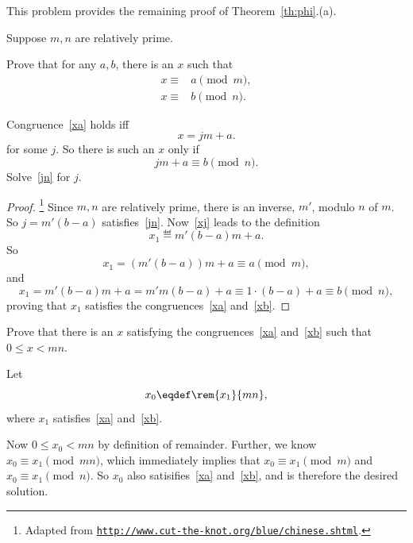 \begin{notesproblem}\label{phi2}
This problem provides the remaining proof of Theorem~\ref{th:phi}.(a).

Suppose $m,n$ are relatively prime.

\bparts

\ppart Prove that for any $a,b$, there is an
$x$ such that
\begin{align}
x \equiv & a \pmod{m}, \label{xa}\\
x \equiv & b \pmod{n} \label{xb}.
\end{align}

\hint Congruence~\eqref{xa} holds iff
\begin{equation}\label{xj}
x = jm + a.
\end{equation}
for some $j$.  So there is such an $x$ only if
\begin{equation}\label{jn}
j m +a \equiv b \pmod{n}.
\end{equation}
Solve~\eqref{jn} for $j$.

\begin{solution}
\begin{proof}
\footnote{Adapted from
\href{http://www.cut-the-knot.org/blue/chinese.shtml}{\texttt{http://www.cut-the-knot.org/blue/chinese.shtml}}.}
Since $m,n$ are relatively prime, there is an inverse, $m'$, modulo $n$ of
$m$.  So $j = m'(b-a)$ satisfies~\eqref{jn}.  Now~\eqref{xj} leads to the
definition
\[
x_1 \eqdef m'(b-a)m + a.
\]
So
\[
x_1 = (m'(b-a))m + a \equiv a \pmod{m}, 
\]
and
\[
x_1 = m'(b-a)m + a = m'm(b-a) +a \equiv 1\cdot(b-a) + a \equiv b \pmod{n},
\]
proving that $x_1$ satisfies the congruences~\eqref{xa} and~\eqref{xb}.
\end{proof}
\end{solution}

\ppart\label{x0} Prove that there is an $x$ satisfying the
congruences~\eqref{xa} and~\eqref{xb} such that $0 \leq x < mn$.

\begin{solution}
Let
\[
x_0 \eqdef \rem{x_1}{mn},
\]
where $x_1$ satisfies~\eqref{xa} and~\eqref{xb}.

Now $0 \leq x_0 < mn$ by definition of remainder.  Further, we know $x_0
\equiv x_1 \pmod{mn}$, which immediately implies that $x_0 \equiv x_1 \pmod{m}$ and $x_0 \equiv x_1 \pmod{n}$.  So $x_0$ also satisifies~\eqref{xa}
and~\eqref{xb}, and is therefore the desired solution.

\end{solution}


\end{notesproblem}

